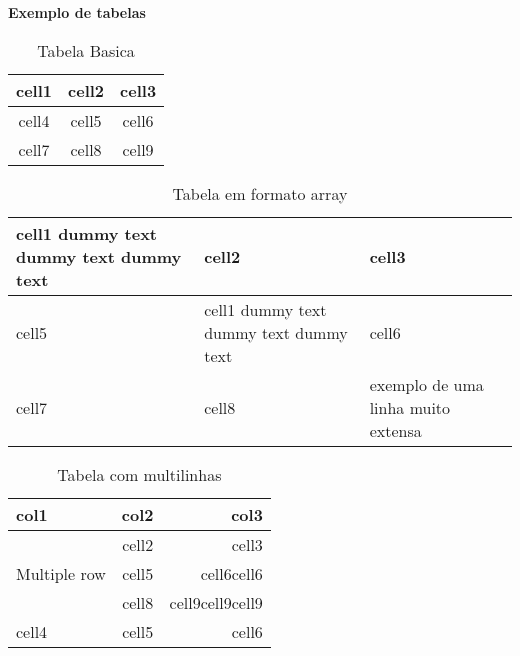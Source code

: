 \documentclass[11pt,a4paper]{report}%
\begin{document}
\textbf{Exemplo de tabelas}\\
\begin{table}[h!] %
\begin{center} %
\begin{tabular}{ | c | c | c | } %
  \hline  %
  cell1 & cell2 & cell3 \\
  \hline
  cell4 & cell5 & cell6 \\
  cell7 & cell8 & cell9 \\
  \hline
\end{tabular}
\end{center}
\caption{Tabela Basica} \label{tab:tabelaBasica}
\end{table}


\begin{table}[h!] %
\begin{center}
\begin{tabular}{ | m{5em} | p{1cm}| b{1in} | } %
\hline
cell1 dummy text dummy text dummy text& cell2 & cell3 \\
\hline
cell5 & cell1 dummy text dummy text dummy text & cell6 \\
\hline
cell7 & cell8 & exemplo de uma linha muito extensa \\
\hline
\end{tabular}
\caption{Tabela em formato array } \label{tab:tabelaArray}
\end{center}
\end{table}


\begin{table}[h!]
\begin{center}
\begin{tabular}{ |l|c|r| }
\hline
col1 & col2 & col3 \\
  \hline
  \multirow{3}{4cm}{Multiple row} & cell2 & cell3 \\ %

  & cell5 & cell6cell6 \\
  & cell8 & cell9cell9cell9 \\
  \hline
  cell4 & cell5 & cell6 \\
  \hline
\end{tabular}
\end{center}
\caption{Tabela com multilinhas}
\end{table}
\end{document}
